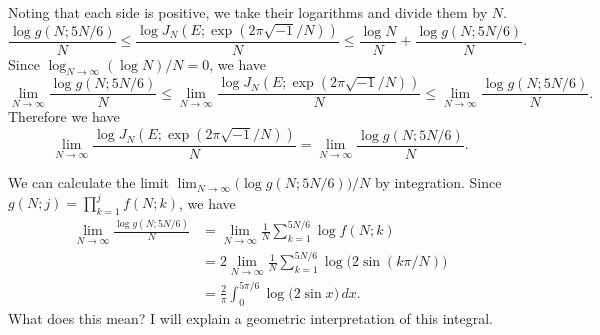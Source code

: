 \documentclass{amsart}
\theoremstyle{definition}
\theoremstyle{remark}
\numberwithin{equation}{section}
\begin{document}
Noting that each side is positive, we take their logarithms and divide them by $N$.
\begin{equation*}
  \frac{\log{g(N;5N/6)}}{N}
  \le
  \frac{\log J_N\left(E;\exp(2\pi\sqrt{-1}/N)\right)}{N}
  \le
  \frac{\log{N}}{N}+
  \frac{\log{g(N;5N/6)}}{N}.
\end{equation*}
Since $\log_{N\to\infty}(\log{N})/N=0$, we have
\begin{equation*}
  \lim_{N\to\infty}\frac{\log{g(N;5N/6)}}{N}
  \le
  \lim_{N\to\infty}
  \frac{\log J_N\left(E;\exp(2\pi\sqrt{-1}/N)\right)}{N}
  \le
  \lim_{N\to\infty}\frac{\log{g(N;5N/6)}}{N}.
\end{equation*}
Therefore we have
\begin{equation*}
  \lim_{N\to\infty}
  \frac{\log{J_N\left(E;\exp(2\pi\sqrt{-1}/N)\right)}}{N}
  =
  \lim_{N\to\infty}\frac{\log{g(N;5N/6)}}{N}.
\end{equation*}
\par
We can calculate the limit $\lim_{N\to\infty}\bigl(\log{g(N;5N/6)}\bigr)/N$ by integration.
Since $g(N;j)=\prod_{k=1}^{j}f(N;k)$, we have
\begin{equation}\label{eq:Jones_integral}
\begin{split}
  \lim_{N\to\infty}\frac{\log{g(N;5N/6)}}{N}
  &=
  \lim_{N\to\infty}
  \frac{1}{N}
  \sum_{k=1}^{5N/6}\log{f(N;k)}
  \\
  &=
  2
  \lim_{N\to\infty}
  \frac{1}{N}
  \sum_{k=1}^{5N/6}\log\bigl(2\sin(k\pi/N)\bigr)
  \\
  &=
  \frac{2}{\pi}
  \int_{0}^{5\pi/6}
  \log\bigl(2\sin{x}\bigr)\,dx.
\end{split}
\end{equation}
What does this mean?
I will explain a geometric interpretation of this integral.
\end{document}
